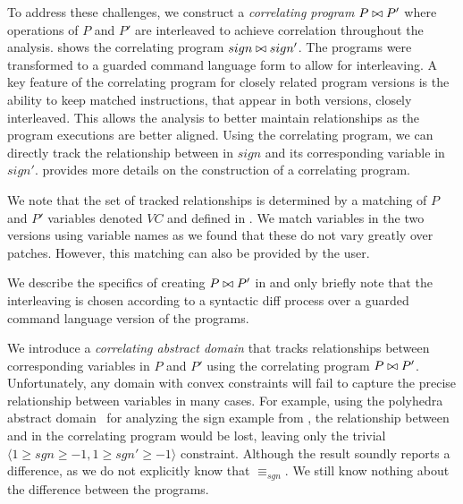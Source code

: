 To address these challenges, we construct a \emph{correlating program} $P \bowtie P'$ where operations of $P$ and $P'$ are interleaved to achieve correlation throughout the analysis.  shows the correlating program $sign \bowtie sign'$. The programs were transformed to a guarded command language form to allow for interleaving. A key feature of the correlating program for closely related program versions is the ability to keep matched instructions, that appear in both versions, closely interleaved. This allows the analysis to better maintain relationships as the program executions are better aligned. Using the correlating program, we can directly track the relationship between  in $sign$ and its corresponding variable  in $sign'$.  provides more details on the construction of a correlating program.
%

We note that the set of tracked relationships is determined by a matching of $P$ and $P'$ variables denoted $VC$ and defined in . We match variables in the two versions using variable names as we found that these do not vary greatly over patches. However, this matching can also be provided by the user.

We describe the specifics of creating $P \bowtie P'$ in  and only briefly note that the interleaving is chosen according to a syntactic diff process over a guarded command language version of the programs.

We introduce a \emph{correlating abstract domain} that tracks relationships between corresponding variables in $P$ and $P'$ using the correlating program $P \bowtie P'$. Unfortunately, any domain with convex constraints will fail to capture the precise relationship between variables in many cases. For example, using the polyhedra abstract domain~\cite{CousotHalbwachs78} for analyzing the sign example from , the relationship between  and  in the correlating program would be lost, leaving only the trivial $\langle 1 \geq sgn \geq -1, 1 \geq sgn' \geq -1 \rangle$ constraint. Although the result soundly reports a difference, as we do not explicitly know that $\equiv_{sgn}$. We still know nothing about the difference between the programs.

